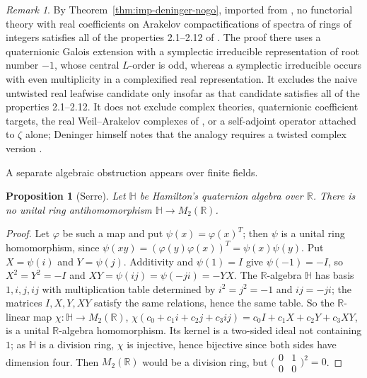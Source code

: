 \documentclass[11pt]{amsart}
\theoremstyle{plain}
\newtheorem{proposition}[theorem]{Proposition}
\theoremstyle{definition}
\theoremstyle{remark}
\newtheorem{remark}[theorem]{Remark}
\numberwithin{equation}{section}
\newcommand{\R}{\mathbb{R}}
\begin{document}
\begin{remark}\label{rem:R5-import}
By Theorem~\ref{thm:imp-deninger-nogo}, imported from
\cite[Theorem~2.13]{Deninger2022NoWeil}, no functorial theory with real
coefficients on Arakelov compactifications of spectra of rings of
integers satisfies all of the properties 2.1--2.12 of
\cite{Deninger2022NoWeil}. The proof there uses a quaternionic Galois
extension with a symplectic irreducible representation of root number
$-1$, whose central $L$-order is odd, whereas a symplectic irreducible
occurs with even multiplicity in a complexified real representation. It
excludes the naive untwisted real leafwise candidate only insofar as
that candidate satisfies all of the properties 2.1--2.12. It does not
exclude complex theories, quaternionic coefficient targets, the real
Weil--Arakelov complexes of
\cite[\S3]{FlachMorin2020DeningerWeilArakelov}, or a self-adjoint
operator attached to $\zeta$ alone; Deninger himself notes that the
analogy requires a twisted complex version
\cite[p.~6]{Deninger2022NoWeil}.
\end{remark}

A separate algebraic obstruction appears over finite fields.

\begin{proposition}[Serre]\label{prop:R5}
Let $\mathbb H$ be Hamilton's quaternion algebra over $\R$. There is no
unital ring antihomomorphism $\mathbb H\to M_2(\R)$.
\end{proposition}

\begin{proof}
Let $\varphi$ be such a map and put $\psi(x)=\varphi(x)^T$; then $\psi$
is a unital ring homomorphism, since
$\psi(xy)=(\varphi(y)\varphi(x))^T=\psi(x)\psi(y)$. Put $X=\psi(i)$ and
$Y=\psi(j)$. Additivity and $\psi(1)=I$ give $\psi(-1)=-I$, so
$X^2=Y^2=-I$ and $XY=\psi(ij)=\psi(-ji)=-YX$. The $\R$-algebra $\mathbb H$
has basis $1,i,j,ij$ with multiplication table determined by
$i^2=j^2=-1$ and $ij=-ji$; the matrices $I,X,Y,XY$ satisfy the same
relations, hence the same table. So the $\R$-linear map
$\chi:\mathbb H\to M_2(\R)$, $\chi(c_0+c_1i+c_2j+c_3ij)=c_0I+c_1X+c_2Y
+c_3XY$, is a unital $\R$-algebra homomorphism. Its kernel is a
two-sided ideal not containing $1$; as $\mathbb H$ is a division ring,
$\chi$ is injective, hence bijective since both sides have dimension
four. Then $M_2(\R)$ would be a division ring, but
$\bigl(\begin{smallmatrix}0&1\\0&0\end{smallmatrix}\bigr)^2=0$.
\end{proof}
\end{document}

